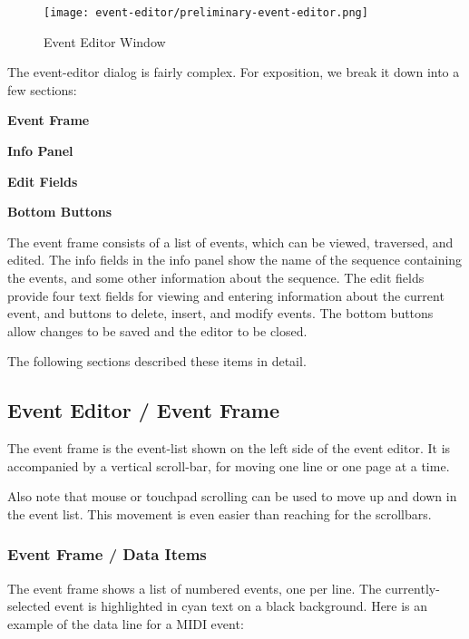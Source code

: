 \begin{figure}[H]
   \centering 
   \texttt{[image: event-editor/preliminary-event-editor.png]}
   \caption{Event Editor Window}
   \label{fig:event_editor_window}
\end{figure}

   The event-editor dialog is fairly complex.
   For exposition, we break it down into a few sections:

   \begin{enumber}
      \item \textbf{Event Frame}
      \item \textbf{Info Panel}
      \item \textbf{Edit Fields}
      \item \textbf{Bottom Buttons}
   \end{enumber}

   The event frame consists of a list of events, which can be viewed,
   traversed, and edited.  The info fields in the info panel show the name of
   the sequence containing the events, and some other information about the
   sequence.  The edit fields provide four text fields for viewing and entering
   information about the current event, and buttons to delete, insert, and
   modify events.  The bottom buttons allow changes to be saved and the editor
   to be closed.  

   The following sections described these items in detail.

\subsection{Event Editor / Event Frame}
\label{subsec:seq64_event_editor_frame}

   The event frame is the event-list shown on the left side of the
   event editor.  It is accompanied by a vertical scroll-bar, for moving one
   line or one page at a time.

   Also note that mouse or touchpad scrolling can be used to move up and down
   in the event list.  This movement is even easier than reaching for the
   scrollbars.

\subsubsection{Event Frame / Data Items}
\label{subsec:seq64_event_frame_data}

   The event frame shows a list of numbered events, one per line.
   The currently-selected event is highlighted in cyan text on a black
   background.  Here is an example of the data line for a MIDI event:

